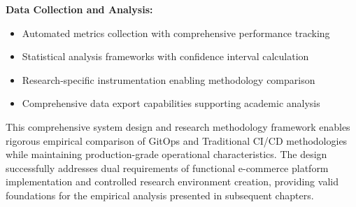 \textbf{Data Collection and Analysis:}
\begin{itemize}
\item Automated metrics collection with comprehensive performance tracking
\item Statistical analysis frameworks with confidence interval calculation
\item Research-specific instrumentation enabling methodology comparison
\item Comprehensive data export capabilities supporting academic analysis
\end{itemize}

This comprehensive system design and research methodology framework enables rigorous empirical comparison of GitOps and Traditional CI/CD methodologies while maintaining production-grade operational characteristics. The design successfully addresses dual requirements of functional e-commerce platform implementation and controlled research environment creation, providing valid foundations for the empirical analysis presented in subsequent chapters.